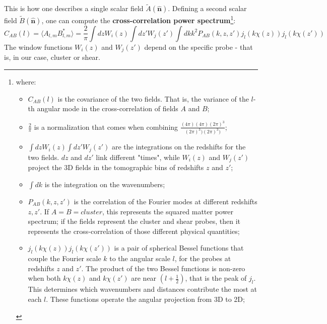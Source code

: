 This is how one describes a single scalar field $\tilde{A}(\hat{\textbf{n}})$. Defining a second scalar field $\tilde{B}(\hat{\textbf{n}})$, one can compute the \textbf{cross-correlation power spectrum}\footnote{
where:
\begin{itemize}
    \item $C_{AB}(l)$ is the covariance of the two fields. That is, the variance of the $l$-th angular mode in the cross-correlation of fields $A$ and $B$;
    \item $\frac{2}{\pi}$ is a normalization that comes when combining $\frac{(4\pi)(4\pi)(2\pi)^3}{(2\pi)^3)(2\pi)^3)}$;
    \item $\int dz W_i(z) \int dz' W_j(z')$ are the integrations on the redshifts for the two fields. $dz$ and $dz'$ link different "times", while $W_i(z)$ and $W_j(z')$ project the 3D fields in the tomographic bins of redshifts $z$ and $z'$;
    \item $ \int dk$ is the integration on the wavenumbers;
    \item $P_{AB}(k,z,z')$ is the correlation of the Fourier modes at different redshifts $z, z'$. If $A=B=cluster$, this represents the squared matter power spectrum; if the fields represent the cluster and shear probes, then it represents the cross-correlation of those different physical quantities;
    \item $j_l(k\chi(z)) j_l(k\chi(z'))$ is a pair of spherical Bessel functions that couple the Fourier scale $k$ to the angular scale $l$, for the probes at redshifts $z$ and $z'$. The product of the two Bessel functions is non-zero when both $k\chi(z)$ and $k\chi(z')$ are near $(l+\frac{1}{2})$, that is the peak of $j_l$. This determines which wavenumbers and distances contribute the most at each $l$. These functions operate the angular projection from 3D to 2D;
    \end{itemize}
}:
\begin{equation}
    C_{AB}(l) = \langle A_{l,m} B_{l,m}^*\rangle = \frac{2}{\pi} \int dz W_i(z) \int dz' W_j(z') \int dk k^2 P_{AB}(k,z,z') j_l(k\chi(z)) j_l(k\chi(z'))
\label{eq7_blast}
\end{equation}
The window functions $W_i(z)$ and $W_j(z')$ depend on the specific probe - that is, in our case, cluster or shear. \\
